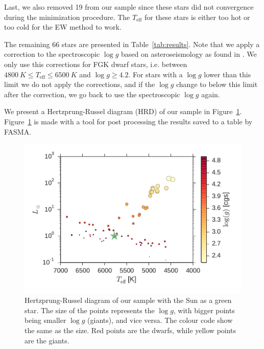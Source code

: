 \documentclass{aa}
\begin{document}
Last, we also removed 19 from our sample since these stars did not convergence
during the minimization procedure. The $T_\mathrm{eff}$ for these stars is
either too hot or too cold for the EW method to work.

The remaining 66 stars are presented in Table~\ref{tab:results}. Note that we
apply a correction to the spectroscopic $\log g$ based on asteroseismology as
found in \citet{Mortier2014}. We only use this corrections for FGK dwarf stars,
i.e. between $\SI{4800}{K}\leq T_\mathrm{eff} \leq \SI{6500}{K}$ and $\log
g\geq4.2$. For stars with a $\log g$ lower than this limit we do not apply the
corrections, and if the $\log g$ change to below this limit after the
correction, we go back to use the spectroscopic $\log g$ again.

We present a Hertzprung-Russel diagram (HRD) of our sample in
Figure~\ref{fig:HRD}. Figure~\ref{fig:HRD} is made with a tool for post
processing the results saved to a table by FASMA.

\begin{figure}[tpb]
    \centering
    \includegraphics[width=1.0\linewidth,natwidth=440,natheight=290]{figures/HR.pdf}
    \caption{Hertzprung-Russel diagram of our sample with the Sun as a green
    star. The size of the points represents the $\log g$, with bigger points
    being smaller $\log g$ (giants), and vice versa. The colour code show the
    same as the size. Red points are the dwarfs, while yellow points are the
    giants.}
    \label{fig:HRD}
\end{figure}
\end{document}
